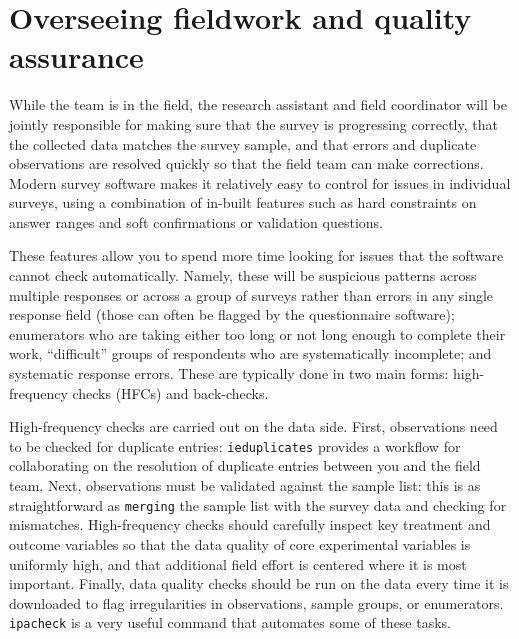 
\section{Overseeing fieldwork and quality assurance}

While the team is in the field, the research assistant
and field coordinator will be jointly responsible
for making sure that the survey is progressing correctly,
that the collected data matches the survey sample,
and that errors and duplicate observations are resolved
quickly so that the field team can make corrections.
Modern survey software makes it relatively easy
to control for issues in individual surveys,
using a combination of in-built features
such as hard constraints on answer ranges
and soft confirmations or validation questions.

These features allow you to spend more time
looking for issues that the software cannot check automatically.
Namely, these will be suspicious patterns across multiple responses
or across a group of surveys rather than errors in any single response field
(those can often be flagged by the questionnaire software);
enumerators who are taking either too long or not long enough to complete their work,
``difficult'' groups of respondents who are systematically incomplete; and
systematic response errors.
These are typically done in two main forms:
high-frequency checks (HFCs) and back-checks.

High-frequency checks are carried out on the data side.
First, observations need to be checked for duplicate entries:
\texttt{ieduplicates}
provides a workflow for collaborating on the resolution of
duplicate entries between you and the field team.
Next, observations must be validated against the sample list:
this is as straightforward as \texttt{merging} the sample list with
the survey data and checking for mismatches.
High-frequency checks should carefully inspect
key treatment and outcome variables
so that the data quality of core experimental variables is uniformly high,
and that additional field effort is centered where it is most important.
Finally, data quality checks
should be run on the data every time it is downloaded
to flag irregularities in observations, sample groups, or enumerators.
\texttt{ipacheck} is a very useful command that automates some of these tasks.

